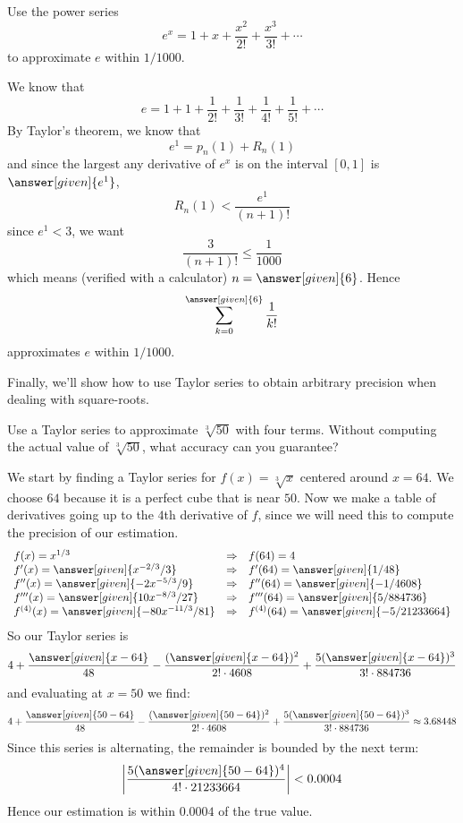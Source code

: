 \documentclass{ximera}
\begin{document}
\begin{example}
  Use the power series 
  \[
  e^x = 1+x+\frac{x^2}{2!}+\frac{x^3}{3!}+\cdots
  \]
  to approximate $e$ within $1/1000$.
  \begin{explanation}
    We know that
	\[
	e = 1+1+\frac{1}{2!}+\frac{1}{3!}+\frac{1}{4!}+\frac{1}{5!}+\cdots
	\]
        By Taylor's theorem, we know that
        \[
        e^1 = p_n(1) + R_n(1)
        \]
        and since the largest any derivative of $e^x$ is on the
        interval $[0,1]$ is $\answer[given]{e^1}$,
        \[
        R_n(1) < \frac{e^1}{(n+1)!} 
        \]
        since $e^1<3$, we want
        \[
        \frac{3}{(n+1)!} \le \frac{1}{1000}
        \]
        which means (verified with a calculator) $n=\answer[given]{6}$. Hence
        \[
        \sum_{k=0}^{\answer[given]{6}}\frac{1}{k!}
        \]
        approximates $e$ within $1/1000$.
  \end{explanation}
\end{example}

Finally, we'll show how to use Taylor series to obtain arbitrary
precision when dealing with square-roots.

\begin{example}
  Use a Taylor series to approximate $\sqrt[3]{50}$ with four
  terms. Without computing the actual value of $\sqrt[3]{50}$, what
  accuracy can you guarantee?
  \begin{explanation}
    We start by finding a Taylor series for $f(x) = \sqrt[3]{x}$
    centered around $x=64$. We choose $64$ because it is a perfect
    cube that is near $50$. Now we make a table of derivatives going
    up to the $4$th derivative of $f$, since we will need this to
    compute the precision of our estimation.
    \[
    \begin{array}{lcl}
      f(x) = x^{1/3} & \Rightarrow &f(64) = 4\\
      f'(x) = \answer[given]{x^{-2/3}/3} & \Rightarrow & f'(64) = \answer[given]{1/48}\\
      f''(x) = \answer[given]{-2x^{-5/3}/9} &\Rightarrow &f''(64) = \answer[given]{-1/4608}\\
      f'''(x) = \answer[given]{10x^{-8/3}/27} &\Rightarrow &f'''(64) = \answer[given]{5/884736}\\
      f^{(4)}(x) = \answer[given]{-80 x^{-11/3}/81} &\Rightarrow &f^{(4)}(64) = \answer[given]{-5/21233664}
    \end{array}
    \]
    So our Taylor series is
    \[
    4 + \frac{\answer[given]{x-64}}{48} - \frac{(\answer[given]{x-64})^2}{2!\cdot 4608} + \frac{5(\answer[given]{x-64})^3}{3!\cdot 884736}
    \]
    and evaluating at $x=50$ we find:
    \[
    4 + \frac{\answer[given]{50-64}}{48} - \frac{(\answer[given]{50-64})^2}{2!\cdot 4608} + \frac{5(\answer[given]{50-64})^3}{3!\cdot 884736} \approx 3.68448
    \]
    Since this series is alternating, the remainder is bounded by the next term:
    \[
    \left|\frac{5(\answer[given]{50-64})^4}{4!\cdot 21233664}\right| < 0.0004 
    \]
    Hence our estimation is within $0.0004$ of the true value.
  \end{explanation}
\end{example}
\end{document}
